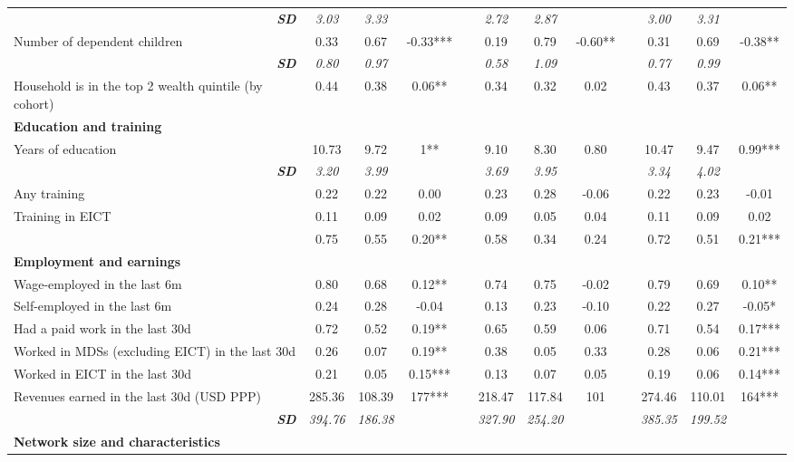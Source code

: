 \begin{landscape}
{\begin{longtable}{m{9cm}ccccccccccc}
\multicolumn{1}{r}{\textit{\textbf{SD}}}&\textit{3.03}&\textit{3.33}&&&\textit{2.72}&\textit{2.87}&&&\textit{3.00}&\textit{3.31}&\\
Number of dependent children&0.33&0.67&    -0.33***&&0.19&0.79&    -0.60**&&0.31&0.69&    -0.38**\\
\multicolumn{1}{r}{\textit{\textbf{SD}}}&\textit{0.80}&\textit{0.97}&&&\textit{0.58}&\textit{1.09}&&&\textit{0.77}&\textit{0.99}&\\
Household is in the top 2 wealth quintile (by cohort)&0.44&0.38&     0.06**&&0.34&0.32&     0.02 &&0.43&0.37&     0.06**\\
\textbf{Education and training}&&&&&&&&&&&\\
Years of education&10.73&9.72&        1**&&9.10&8.30&     0.80 &&10.47&9.47&     0.99***\\
\multicolumn{1}{r}{\textit{\textbf{SD}}}&\textit{3.20}&\textit{3.99}&&&\textit{3.69}&\textit{3.95}&&&\textit{3.34}&\textit{4.02}&\\
Any training&0.22&0.22&     0.00 &&0.23&0.28&    -0.06 &&0.22&0.23&    -0.01 \\
Training in EICT&0.11&0.09&     0.02 &&0.09&0.05&     0.04 &&0.11&0.09&     0.02 \\
&0.75&0.55&     0.20**&&0.58&0.34&     0.24 &&0.72&0.51&     0.21***\\
\textbf{Employment and earnings}&&&&&&&&&&&\\
Wage-employed in the last 6m&0.80&0.68&     0.12**&&0.74&0.75&    -0.02 &&0.79&0.69&     0.10**\\
Self-employed in the last 6m&0.24&0.28&    -0.04 &&0.13&0.23&    -0.10 &&0.22&0.27&    -0.05*\\
Had a paid work in the last 30d&0.72&0.52&     0.19**&&0.65&0.59&     0.06 &&0.71&0.54&     0.17***\\
Worked in MDSs (excluding EICT) in the last 30d&0.26&0.07&     0.19**&&0.38&0.05&     0.33 &&0.28&0.06&     0.21***\\
Worked in EICT in the last 30d&0.21&0.05&     0.15***&&0.13&0.07&     0.05 &&0.19&0.06&     0.14***\\
Revenues earned in the last 30d (USD PPP)&285.36&108.39&      177***&&218.47&117.84&      101 &&274.46&110.01&      164***\\
\multicolumn{1}{r}{\textit{\textbf{SD}}}&\textit{394.76}&\textit{186.38}&&&\textit{327.90}&\textit{254.20}&&&\textit{385.35}&\textit{199.52}&\\
\textbf{Network size and characteristics}&&&&&&&&&&&\\

\end{longtable}}
\end{landscape}
